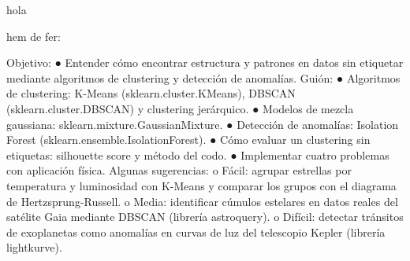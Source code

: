 hola

hem de fer:

Objetivo:
● Entender cómo encontrar estructura y patrones en datos sin etiquetar mediante
algoritmos de clustering y detección de anomalías.
Guión:
● Algoritmos de clustering: K-Means (sklearn.cluster.KMeans), DBSCAN
(sklearn.cluster.DBSCAN) y clustering jerárquico.
● Modelos de mezcla gaussiana: sklearn.mixture.GaussianMixture.
● Detección de anomalías: Isolation Forest (sklearn.ensemble.IsolationForest).
● Cómo evaluar un clustering sin etiquetas: silhouette score y método del codo.
● Implementar cuatro problemas con aplicación física. Algunas sugerencias:
o Fácil: agrupar estrellas por temperatura y luminosidad con K-Means y
comparar los grupos con el diagrama de Hertzsprung-Russell.
o Media: identificar cúmulos estelares en datos reales del satélite Gaia mediante
DBSCAN (librería astroquery).
o Difícil: detectar tránsitos de exoplanetas como anomalías en curvas de luz del
telescopio Kepler (librería lightkurve).

